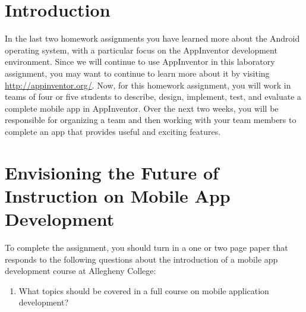 

\usepackage[compact]{titlesec}



\section*{Introduction}

In the last two homework assignments you have learned more about the Android operating system, with a particular focus
on the AppInventor development environment. Since we will continue to use AppInventor in this laboratory assignment, you
may want to continue to learn more about it by visiting \url{http://appinventor.org/}.  Now, for this homework
assignment, you will work in teams of four or five students to describe, design, implement, test, and evaluate a
complete mobile app in AppInventor.  Over the next two weeks, you will be responsible for organizing a team and then
working with your team members to complete an app that provides useful and exciting features.

\section*{Envisioning the Future of Instruction on Mobile App Development}

\noindent
To complete the assignment, you should turn in a one or two page paper that responds to the following questions about
the introduction of a mobile app development course at Allegheny College: 
\vspace*{-.1in}
\begin{enumerate}
    \itemsep0em
    \item What topics should be covered in a full course on mobile application development?  
\end{enumerate}


